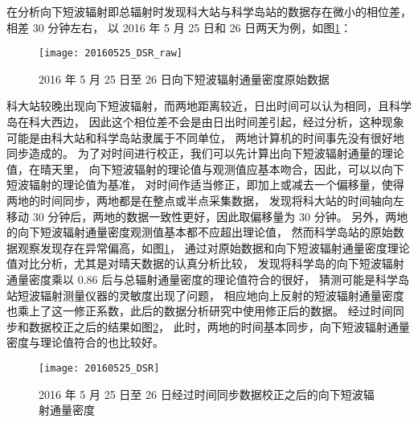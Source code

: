 在分析向下短波辐射即总辐射时发现科大站与科学岛站的数据存在微小的相位差，相差 30 分钟左右，
以 2016 年 5 月 25 日和 26 日两天为例，如图\ref{fig:20160525_DSR_raw}：
\begin{figure}[H]
\centering
\texttt{[image: 20160525\_DSR\_raw]}
\caption{2016 年 5 月 25 日至 26 日向下短波辐射通量密度原始数据}\label{fig:20160525_DSR_raw}
\end{figure}
科大站较晚出现向下短波辐射，而两地距离较近，日出时间可以认为相同，且科学岛在科大西边，
因此这个相位差不会是由日出时间差引起，经过分析，这种现象可能是由科大站和科学岛站隶属于不同单位，
两地计算机的时间事先没有很好地同步造成的。
为了对时间进行校正，我们可以先计算出向下短波辐射通量的理论值，在晴天里，
向下短波辐射的理论值与观测值应基本吻合，因此，可以以向下短波辐射的理论值为基准，
对时间作适当修正，即加上或减去一个偏移量，使得两地的时间同步，两地都是在整点或半点采集数据，
发现将科大站的时间轴向左移动 30 分钟后，两地的数据一致性更好，因此取偏移量为 30 分钟。
另外，两地的向下短波辐射通量密度观测值基本都不应超出理论值，
然而科学岛站的原始数据观察发现存在异常偏高，如图\ref{fig:20160525_DSR_raw}，
通过对原始数据和向下短波辐射通量密度理论值对比分析，尤其是对晴天数据的认真分析比较，
发现将科学岛的向下短波辐射通量密度乘以 0.86 后与总辐射通量密度的理论值符合的很好，
猜测可能是科学岛站短波辐射测量仪器的灵敏度出现了问题，
相应地向上反射的短波辐射通量密度也乘上了这一修正系数，此后的数据分析研究中使用修正后的数据。
经过时间同步和数据校正之后的结果如图\ref{fig:20160525_DSR}，
此时，两地的时间基本同步，向下短波辐射通量密度与理论值符合的也比较好。
\begin{figure}[H]
\centering
\texttt{[image: 20160525\_DSR]}
\caption{2016 年 5 月 25 日至 26 日经过时间同步数据校正之后的向下短波辐射通量密度}\label{fig:20160525_DSR}
\end{figure}

